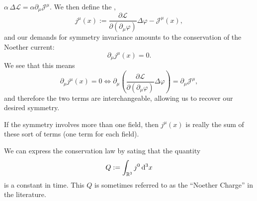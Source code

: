 $\alpha\,\Delta\mathcal{L}=\alpha\partial_{\mu}\mathcal{J}^{\mu}$. We
then define the ,
\begin{equation}
j^{\mu}(x) := \frac{\partial\mathcal{L}}{\partial(\partial_{\mu}\varphi)}\Delta\varphi-\mathcal{J}^{\mu}(x),
\end{equation}
and our demands for symmetry invariance amounts to the conservation of
the Noether current:
\begin{equation}
\partial_{\mu}j^{\mu}(x) = 0.
\end{equation}
We see that this means
\begin{equation}
\partial_{\mu}j^{\mu}(x) = 0\iff\partial_{\mu}\left(\frac{\partial\mathcal{L}}{\partial(\partial_{\mu}\varphi)}\Delta\varphi\right)=\partial_{\mu}\mathcal{J}^{\mu},
\end{equation}
and therefore the two terms are interchangeable, allowing us to recover
our desired symmetry.

\begin{remark}
If the symmetry involves more than one field, then $j^{\mu}(x)$ is
really the sum of these sort of terms (one term for each field).
\end{remark}

We can express the conservation law by sating that the quantity
\begin{equation}
Q := \int_{\mathbb{R}^{3}}j^{0}\,\mathrm{d}^{3}x
\end{equation}
is a constant in time. This $Q$ is sometimes referred to as the
``Noether Charge'' in the literature.

